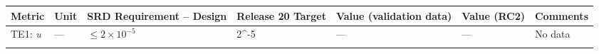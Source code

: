 \documentclass[DM,lsstdraft,toc]{lsstdoc}
\begin{document}
\begin{longtable}[]{@{}lllllll@{}}
\toprule
\begin{minipage}[b]{0.12\columnwidth}\raggedright\strut
Metric\strut
\end{minipage} & \begin{minipage}[b]{0.06\columnwidth}\raggedright\strut
Unit\strut
\end{minipage} & \begin{minipage}[b]{0.14\columnwidth}\raggedright\strut
SRD Requirement -- Design\strut
\end{minipage} & \begin{minipage}[b]{0.14\columnwidth}\raggedright\strut
Release 20 Target\strut
\end{minipage} & \begin{minipage}[b]{0.12\columnwidth}\raggedright\strut
Value (validation data)\strut
\end{minipage} & \begin{minipage}[b]{0.12\columnwidth}\raggedright\strut
Value (RC2) \strut
\end{minipage} & \begin{minipage}[b]{0.17\columnwidth}\raggedright\strut
Comments\strut
\end{minipage}\tabularnewline
\midrule
\endhead
\begin{minipage}[t]{0.12\columnwidth}\raggedright\strut
TE1: \emph{u}\strut
\end{minipage} & \begin{minipage}[t]{0.06\columnwidth}\raggedright\strut
---\strut
\end{minipage} & \begin{minipage}[t]{0.14\columnwidth}\raggedright\strut
\(\leq 2\times10^{-5}\)\strut
\end{minipage} & \begin{minipage}[t]{0.14\columnwidth}\raggedright\strut
2\times10^{-5}\strut
\end{minipage} & \begin{minipage}[t]{0.12\columnwidth}\raggedright\strut
---\strut
\end{minipage} & \begin{minipage}[t]{0.12\columnwidth}\raggedright\strut
--- \strut
\end{minipage} & \begin{minipage}[t]{0.17\columnwidth}\raggedright\strut
No data\strut
\end{minipage}\tabularnewline
\begin{minipage}[t]{0.12\columnwidth}\raggedright\strut

\end{minipage}
\end{longtable}
\end{document}
